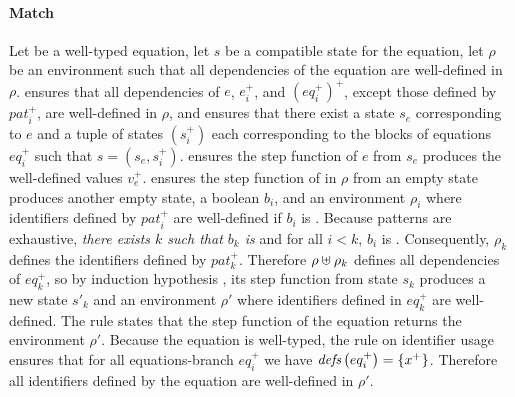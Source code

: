 \begin{skippableproof}
    \paragraph{Match}
    Let  be a well-typed  equation, let
    $s$ be a compatible state for the equation, let $\rho$ be an environment such that all
    dependencies of the equation are well-defined in $\rho$.
     ensures that all dependencies
    of $e$, $e_i^+$, and $(eq_i^+)^+$, except those defined by $pat_i^+$, are well-defined in
    $\rho$, and  ensures that there exist a state
    $s_e$ corresponding to $e$ and a tuple of states $(s_i^+)$ each corresponding to the blocks of
    equations $eq_i^+$ such that $s = (s_e, s_i^+)$.
     ensures the step function of $e$ from $s_e$
    produces the well-defined values $v_e^+$.
     ensures the step function of
     in $\rho$ from an empty state produces another
    empty state, a boolean $b_i$, and an environment $\rho_i$ where identifiers defined by $pat_i^+$
    are well-defined if $b_i$ is \true.
    Because patterns are exhaustive, \emph{there exists $k$ such that $b_k$ is \true} and for all
    $i < k$, $b_i$ is \false. Consequently, $\rho_k$ defines the identifiers defined by
    $pat_k^+$.
    Therefore $\rho \uplus \rho_k$ defines all dependencies of $eq_k^+$, so by induction hypothesis%
    , its step function from state $s_k$ produces a new state $s'_k$ and an environment $\rho'$
    where identifiers defined in $eq_k^+$ are well-defined.
    The rule  states that
    the step function of the  equation returns the environment $\rho'$. Because the
     equation is well-typed,
    the rule  on identifier usage ensures that
    for all equations-branch $eq_i^+$ we have
    ${\textit{defs}\left(eq_i^+\right)} = \{x^+\}$. Therefore all identifiers defined by the  equation are
    well-defined in $\rho'$.


\end{skippableproof}
